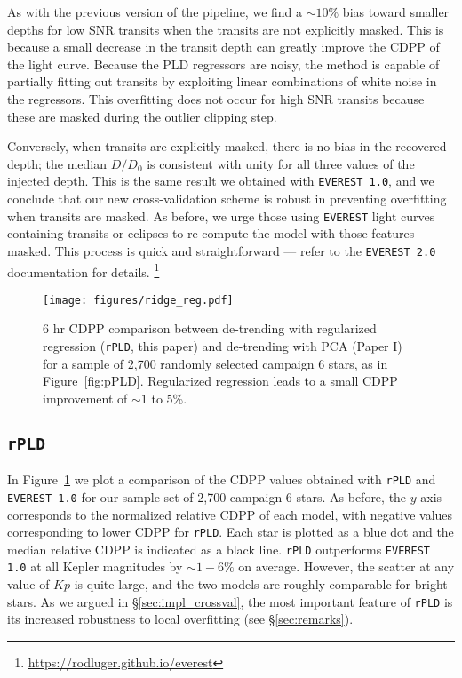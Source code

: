 \documentclass[]{aastex62}
\newcommand{\Kp}{\ensuremath{Kp}}
\newcommand{\edited}[1]{{\color{red} #1}}
\begin{document}
As with the previous version of the pipeline, we find a ${\sim}10\%$ bias toward
smaller depths for low SNR transits when the transits are not explicitly masked. This
is because a small decrease in the transit depth can greatly improve the CDPP
of the light curve. Because the PLD regressors are noisy, the method is capable
of partially fitting out transits by exploiting linear combinations of white noise
in the regressors. This overfitting does not occur for high SNR transits because these
are masked during the outlier clipping step.

Conversely, when transits are explicitly masked, there is no bias in the recovered
depth; the median $D/D_0$ is consistent with unity for all three values of the injected
depth. This is the same result we obtained with \texttt{EVEREST 1.0}, and we conclude
that our new cross-validation scheme is robust in preventing overfitting when transits
are masked. As before, we urge those using \texttt{EVEREST} light curves containing
transits or eclipses to re-compute the model with those features masked. This process
is quick and straightforward --- refer to the \texttt{EVEREST 2.0} documentation for
details.
\footnote{\edited{\url{https://rodluger.github.io/everest}}}\\[0em]

\begin{figure}[hbt]
  \begin{center}
      \texttt{[image: figures/ridge\_reg.pdf]}
       \caption{6 hr CDPP comparison between de-trending with regularized regression (\texttt{rPLD}, this paper) and
                de-trending with PCA (Paper I) for a sample of 2,700 randomly selected campaign 6
                stars, as in Figure~\ref{fig:pPLD}. Regularized regression leads to a small CDPP improvement of
                ${\sim}1$ to 5\%.}
     \label{fig:rPLD}
  \end{center}
\end{figure}

\subsection{\texttt{rPLD}}
In Figure~\ref{fig:rPLD} we plot a comparison of the CDPP values obtained with \texttt{rPLD}
and \texttt{EVEREST 1.0} for our sample set of 2,700 campaign 6 stars. As before, the $y$
axis corresponds to the normalized relative CDPP of each model, with negative values
corresponding to lower CDPP for \texttt{rPLD}. Each star is plotted as a blue dot and the median
relative CDPP is indicated as a black line. \texttt{rPLD} outperforms \texttt{EVEREST 1.0} at all
Kepler magnitudes by ${\sim}1-6\%$ on average. However, the scatter at any value of
$\Kp$ is quite large, and the two models are roughly comparable for bright stars. As we
argued in \S\ref{sec:impl_crossval}, the most important feature of \texttt{rPLD} is
its increased robustness to local overfitting (see \S\ref{sec:remarks}).\\[0em]
\end{document}
